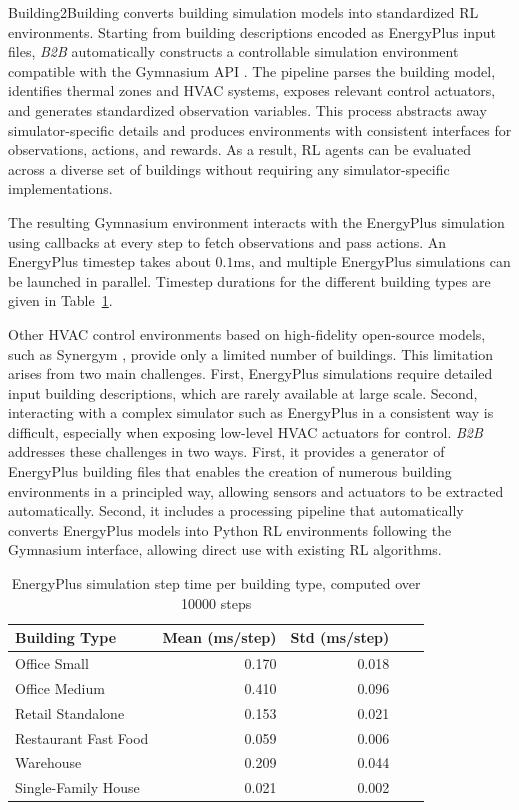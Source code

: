 \documentclass[10pt]{article} %
\newcommand{\btob}{{\textit{B2B}}}
\newcommand{\buildingtobuilding}{{Building2Building}}
\begin{document}
\begin{itemize}
\buildingtobuilding{} converts building simulation models into standardized RL environments. Starting from building descriptions encoded as EnergyPlus input files, \btob{} automatically constructs a controllable simulation environment compatible with the Gymnasium API \citep{towers2024}. The pipeline parses the building model, identifies thermal zones and HVAC systems, exposes relevant control actuators, and generates standardized observation variables. This process abstracts away simulator-specific details and produces environments with consistent interfaces for observations, actions, and rewards. As a result, RL agents can be evaluated across a diverse set of buildings without requiring any simulator-specific implementations.

The resulting Gymnasium environment interacts with the EnergyPlus simulation using callbacks at every step to fetch observations and pass actions. An EnergyPlus timestep takes about $0.1$ms, and multiple EnergyPlus simulations can be launched in parallel. Timestep durations for the different building types are given in Table~\ref{tab:step_time}.

Other HVAC control environments based on high-fidelity open-source models, such as Synergym \cite{campoy2025}, provide only a limited number of buildings. This limitation arises from two main challenges. First, EnergyPlus simulations require detailed input building descriptions, which are rarely available at large scale. Second, interacting with a complex simulator such as EnergyPlus in a consistent way is difficult, especially when exposing low-level HVAC actuators for control. \btob{} addresses these challenges in two ways. First, it provides a generator of EnergyPlus building files that enables the creation of numerous building environments in a principled way, allowing sensors and actuators to be extracted automatically. Second, it includes a processing pipeline that automatically converts EnergyPlus models into Python RL environments following the Gymnasium interface, allowing direct use with existing RL algorithms.


\begin{table}[ht]
\centering
\caption{EnergyPlus simulation step time per building type, computed over 10000 steps}
\label{tab:step_time}
\begin{tabular}{l r r r r}
\toprule
Building Type & Mean (ms/step) & Std (ms/step) \\
\midrule
Office Small & 0.170 & 0.018 &  \\
Office Medium & 0.410 & 0.096 & \\
Retail Standalone & 0.153 & 0.021 & \\
Restaurant Fast Food & 0.059 & 0.006 \\
Warehouse & 0.209 & 0.044  \\
Single-Family House & 0.021 & 0.002 \\
\bottomrule
\end{tabular}
\end{table} 


\end{itemize}
\end{document}
